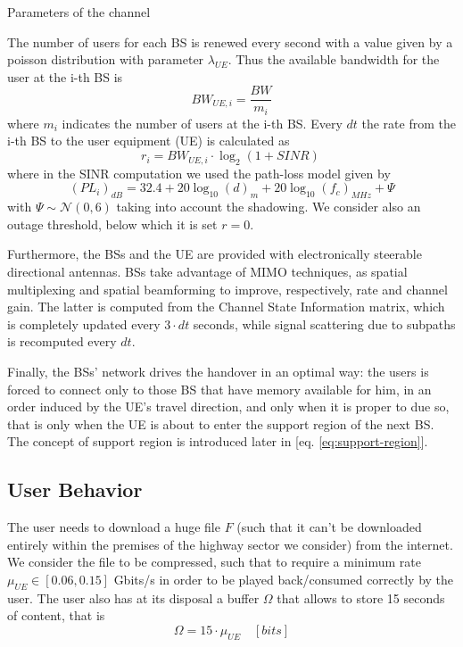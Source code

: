 \documentclass[conference,10pt]{IEEEtran}
\begin{document}
\begin{table}
	\caption{Parameters of the channel}
	\label{tab:params}
	
\end{table}

The number of users for each BS is renewed every second with a value given by a poisson distribution with parameter $\lambda_{U\!E}$. Thus the available bandwidth for the user at the i-th BS is
\begin{equation}
	\label{bandwidth}
	BW_{U\!E,i} = \frac{BW}{m_i}
\end{equation}
where $m_i$ indicates the number of users at the i-th BS.
Every $dt$ the rate from the i-th BS to the user equipment (UE) is calculated as
\begin{equation}
	\label{eq:rate}
	r_i = BW_{U\!E,i}\cdot\log_2(1+SINR) \	
\end{equation}
where in the SINR computation we used the path-loss model given by
\begin{equation}
	(PL_i)_{dB} = 32.4+20\log_{10}(d)_m+20\log_{10}(f_c)_{M\!H\!z}+\Psi
\end{equation}
with $\Psi\sim \mathcal{N}(0,6)$ taking into account the shadowing. We consider also an outage threshold, below which it is set $r = 0$.

Furthermore, the BSs and the UE are provided with electronically steerable directional antennas. BSs take advantage of MIMO techniques, as spatial multiplexing and spatial beamforming to improve, respectively, rate and channel gain. The latter is computed from the Channel State Information matrix, which is completely updated every $3\cdot dt$ seconds, while signal scattering due to subpaths is recomputed every $dt$.

Finally, the BSs' network drives the handover in an optimal way: the users is forced to connect only to those BS that have memory available for him, in an order induced by the UE's travel direction, and only when it is proper to due so, that is only when the UE is about to enter the support region of the next BS. The concept of support region is introduced later in [eq. \ref{eq:support-region}].

\subsection{User Behavior}

The user needs to download a huge file $F$ (such that it can't be downloaded entirely within the premises of the highway sector we consider) from the internet. We consider the file to be compressed, such that to require a minimum rate $\mu_{U\!E} \in [0.06, 0.15]$ Gbits/s in order to be played back/consumed correctly by the user. The user also has at its disposal a buffer $\Omega$ that allows to store 15 seconds of content, that is
\begin{equation}
\Omega = 15 \cdot \mu_{U\!E} \quad [bits]
\end{equation}
\end{document}
